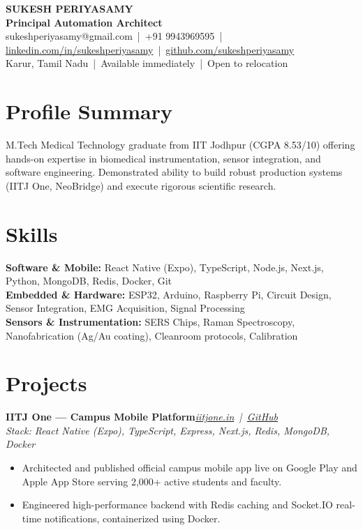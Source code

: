 \documentclass[9.2pt,a4paper]{article}
\newcommand{\role}[3]{\textbf{#1}\hfill\textit{#2}\\[-2pt]\textit{\small #3}\par}
\begin{document}
\begin{center}
{\huge\bfseries SUKESH PERIYASAMY}\\[1.5pt]
{\large\bfseries\color{accent} Principal Automation Architect}\\[1.5pt]
\small sukeshperiyasamy@gmail.com \,|\, +91 9943969595 \,|\, \href{https://linkedin.com/in/sukeshperiyasamy}{linkedin.com/in/sukeshperiyasamy} \,|\, \href{https://github.com/sukeshperiyasamy}{github.com/sukeshperiyasamy}\\
Karur, Tamil Nadu \,|\, Available immediately \,|\, Open to relocation
\end{center}

\section{Profile Summary}
M.Tech Medical Technology graduate from IIT Jodhpur (CGPA 8.53/10) offering hands-on expertise in biomedical instrumentation, sensor integration, and software engineering. Demonstrated ability to build robust production systems (IITJ One, NeoBridge) and execute rigorous scientific research.

\section{Skills}
\textbf{Software \& Mobile:} React Native (Expo), TypeScript, Node.js, Next.js, Python, MongoDB, Redis, Docker, Git\\
\textbf{Embedded \& Hardware:} ESP32, Arduino, Raspberry Pi, Circuit Design, Sensor Integration, EMG Acquisition, Signal Processing\\
\textbf{Sensors \& Instrumentation:} SERS Chips, Raman Spectroscopy, Nanofabrication (Ag/Au coating), Cleanroom protocols, Calibration

\section{Projects}
\role{IITJ One --- Campus Mobile Platform}{\href{https://iitjone.in}{iitjone.in} \,|\, \href{https://github.com/Godevs04/IITJ_One}{GitHub}}{Stack: React Native (Expo), TypeScript, Express, Next.js, Redis, MongoDB, Docker}
\begin{itemize}
  \item Architected and published official campus mobile app live on Google Play and Apple App Store serving 2,000+ active students and faculty.
  \item Engineered high-performance backend with Redis caching and Socket.IO real-time notifications, containerized using Docker.
\end{itemize}
\end{document}
